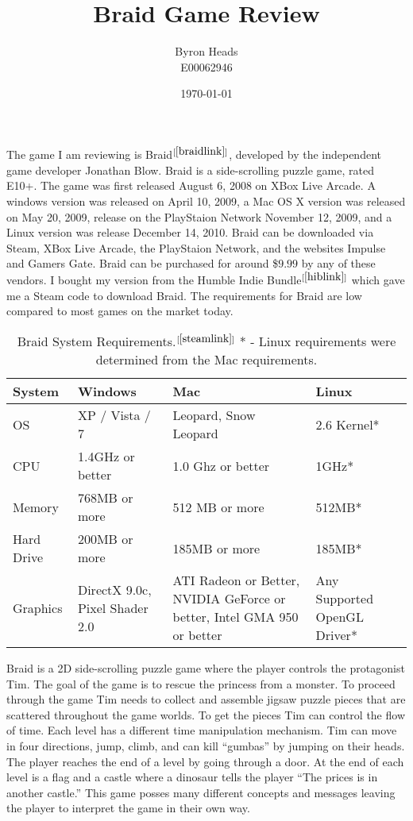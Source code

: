 \documentclass[a4paper,12pt]{report}
\title{Braid Game Review}
\author{Byron Heads \\
		E00062946}
\date{\today}
\begin{document}
\maketitle

\section*{}
The game I am reviewing is Braid$^{[\ref{braidlink}]}$, developed by the
independent game developer Jonathan Blow.  Braid is a side-scrolling puzzle
game, rated E10+.  The game was first released August 6, 2008 on XBox Live
Arcade.  A windows version was released on April 10, 2009, a Mac OS X version
was released on May 20, 2009, release on the PlayStaion Network November 12,
2009, and a Linux version was release December 14, 2010.  Braid can be
downloaded via Steam, XBox Live Arcade, the PlayStaion Network, and the
websites Impulse and Gamers Gate.  Braid can be purchased for around
\$$9.99$ by any of these vendors.  I bought my version from the Humble Indie
Bundle$^{[\ref{hiblink}]}$ which gave me a Steam code to download Braid.
The requirements for Braid are low compared to most games on the market
today.

\begin{table}[hp!]
    \caption{Braid System Requirements.$^{[\ref{steamlink}]}$
    * - Linux requirements were determined from the Mac requirements.  }
    \begin{tabular}{|l|p{3cm}|p{3.5cm}|p{3cm}|}
        \hline
        System & Windows & Mac & Linux \\
        \hline
        OS & XP / Vista / 7 & Leopard, Snow Leopard & 2.6 Kernel* \\
        \hline
        CPU & 1.4GHz or better & 1.0 Ghz or better & 1GHz* \\
        \hline
        Memory & 768MB or more & 512 MB or more &  512MB*\\
        \hline
            Hard Drive & 200MB or more & 185MB or more & 185MB* \\
            \hline
            Graphics & DirectX 9.0c, Pixel Shader 2.0 & ATI Radeon\texttrademark
            9500 or Better, NVIDIA GeForce\texttrademark 5900 or better, Intel
            GMA 950 or better & Any Supported OpenGL Driver* \\ 
            \hline
        \end{tabular}
\end{table}

Braid is a 2D side-scrolling puzzle game where the player controls the
protagonist Tim.  The goal of the game is to rescue the princess from a monster.
To proceed through the game Tim needs to collect and assemble jigsaw puzzle
pieces that are scattered throughout the game worlds.  To get the pieces Tim can
control the flow of time.  Each level has a different time manipulation
mechanism.  Tim can move in four directions, jump, climb, and can kill
``gumbas'' by jumping on their heads.  The player reaches the end of a level by
going through a door.  At the end of each level is a flag and a castle where a
dinosaur tells the player ``The prices is in another castle.''  This game posses
many different concepts and messages leaving the player to interpret the game in
their own way.
\end{document}
